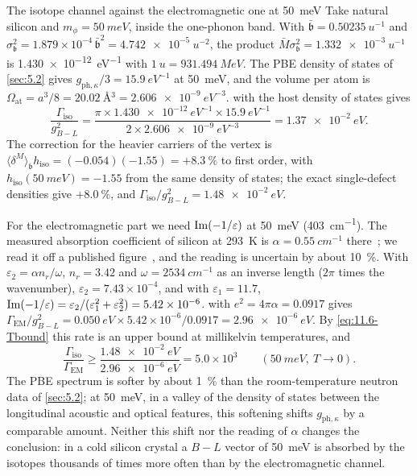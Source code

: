 \begin{workedexample}{The isotope channel against the electromagnetic one at \SI{50}{meV}}\label{we:11-iso}
Take natural silicon and $m_\phi = \SI{50}{meV}$, inside the one-phonon band. With $\bar{\mathfrak{b}} = \SI{0.50235}{u^{-1}}$ and $\sigma_{\mathfrak{b}}^2 = 1.879\times10^{-4}\,\bar{\mathfrak{b}}^2 = \SI{4.742e-5}{u^{-2}}$, the product $\bar M\sigma_{\mathfrak{b}}^2 = \SI{1.332e-3}{u^{-1}}$ is \SI{1.430e-12}{eV^{-1}} with $\SI{1}{u} = \SI{931.494}{MeV}$. The PBE density of states of \cref{sec:5.2} gives $g_{\mathrm{ph},\kappa}/3 = \SI{15.9}{eV^{-1}}$ at \SI{50}{meV}, and the volume per atom is $\Omega_{\mathrm{at}} = a^3/8 = \SI{20.02}{\angstrom^3} = \SI{2.606e-9}{eV^{-3}}$.  with the host density of states gives
\begin{equation*}
  \frac{\varGamma_{\mathrm{iso}}}{g_{B-L}^2} = \frac{\pi\times\SI{1.430e-12}{eV^{-1}}\times\SI{15.9}{eV^{-1}}}{2\times\SI{2.606e-9}{eV^{-3}}} = \SI{1.37e-2}{eV} .
\end{equation*}
The correction for the heavier carriers of the vertex is $\langle\delta^M\rangle_{\mathfrak{b}}h_{\mathrm{iso}} = (-0.054)(-1.55) = +\SI{8.3}{\percent}$ to first order, with $h_{\mathrm{iso}}(\SI{50}{meV}) = -1.55$ from the same density of states; the exact single-defect densities give $+\SI{8.0}{\percent}$, and $\varGamma_{\mathrm{iso}}/g_{B-L}^2 = \SI{1.48e-2}{eV}$.

For the electromagnetic part we need $\operatorname{Im}(-1/\varepsilon)$ at \SI{50}{meV} (\SI{403}{cm^{-1}}). The measured absorption coefficient of silicon at \SI{293}{K} is $\alpha = \SI{0.55}{cm^{-1}}$ there~\cite{ikezawa1981far}; we read it off a published figure~\cite[Fig.~3]{deinzer2004two}, and the reading is uncertain by about \SI{10}{\percent}. With $\varepsilon_2 = \alpha n_r/\omega$, $n_r = 3.42$ and $\omega = \SI{2534}{cm^{-1}}$ as an inverse length ($2\pi$ times the wavenumber), $\varepsilon_2 = 7.43\times10^{-4}$, and with $\varepsilon_1 = 11.7$, $\operatorname{Im}(-1/\varepsilon) = \varepsilon_2/(\varepsilon_1^2 + \varepsilon_2^2) = 5.42\times10^{-6}$.  with $e^2 = 4\pi\alpha = 0.0917$ gives $\varGamma_{\mathrm{EM}}/g_{B-L}^2 = \SI{0.050}{eV}\times5.42\times10^{-6}/0.0917 = \SI{2.96e-6}{eV}$. By \cref{eq:11.6-Tbound} this rate is an upper bound at millikelvin temperatures, and
\begin{equation*}
  \frac{\varGamma_{\mathrm{iso}}}{\varGamma_{\mathrm{EM}}} \ge \frac{\SI{1.48e-2}{eV}}{\SI{2.96e-6}{eV}} = 5.0\times10^3 \qquad (\SI{50}{meV},\ T \to 0).
\end{equation*}
The PBE spectrum is softer by about \SI{1}{\percent} than the room-temperature neutron data of \cref{sec:5.2}; at \SI{50}{meV}, in a valley of the density of states between the longitudinal acoustic and optical features, this softening shifts $g_{\mathrm{ph},\kappa}$ by a comparable amount. Neither this shift nor the reading of $\alpha$ changes the conclusion: in a cold silicon crystal a $B - L$ vector of \SI{50}{meV} is absorbed by the isotopes thousands of times more often than by the electromagnetic channel.
\end{workedexample}

